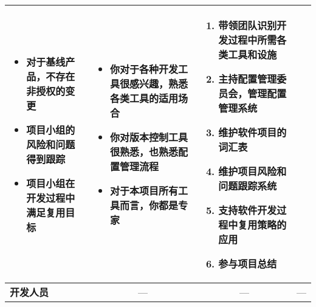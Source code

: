 \begin{spacing}{1.2}
\begin{longtable}{|m{1.5cm}<{\centering}|m{4.2cm}|m{4.2cm}|m{4.2cm}|}
\begin{itemize}[leftmargin=1.3em]
            \item 对于基线产品，不存在非授权的变更
            \item 项目小组的风险和问题得到跟踪
            \item 项目小组在开发过程中满足复用目标
            \vspace{-1.3em}
        \end{itemize} &
        \vspace{-1.1em}
        \begin{itemize}[leftmargin=1.3em]
            \item 你对于各种开发工具很感兴趣，熟悉各类工具的适用场合
            \item 你对版本控制工具很熟悉，也熟悉配置管理流程
            \item 对于本项目所有工具而言，你都是专家
            \vspace{-1.3em}
        \end{itemize} &
        \vspace{-1.1em}
        \begin{enumerate}[label=\arabic*.,leftmargin=1.5em]
            \item 带领团队识别开发过程中所需各类工具和设施
            \item 主持配置管理委员会，管理配置管理系统
            \item 维护软件项目的词汇表
            \item 维护项目风险和问题跟踪系统
            \item 支持软件开发过程中复用策略的应用
            \item 参与项目总结
            \vspace{-1.3em}
        \end{enumerate}\\ \hline
        \textbf{开发人员} & \multicolumn{1}{c|}{—} & \multicolumn{1}{c|}{—} & \multicolumn{1}{c|}{—} \\ \hline
    \end{longtable}
\end{spacing}
\vspace{-5em}
